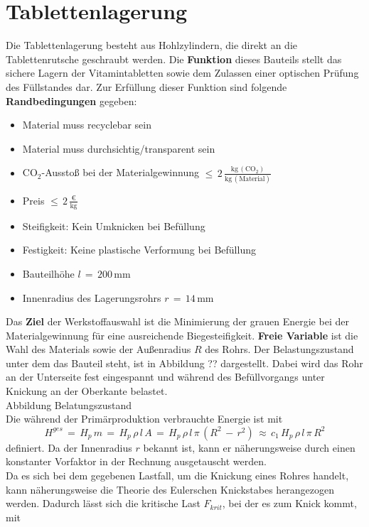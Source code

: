 \section{Tablettenlagerung}
Die Tablettenlagerung besteht aus Hohlzylindern, die direkt an die Tablettenrutsche geschraubt werden. Die \textbf{Funktion} dieses Bauteils stellt das sichere Lagern der Vitamintabletten sowie dem Zulassen einer optischen Prüfung des Füllstandes dar. Zur Erfüllung dieser Funktion sind folgende \textbf{Randbedingungen} gegeben:
\begin{itemize}
	\item Material muss recyclebar sein
	\item Material muss durchsichtig/transparent sein
	\item CO$_2$-Ausstoß bei der Materialgewinnung $\le\,2\,\frac{\text{kg}\,(\text{CO}_2)}{\text{kg}\,(\text{Material})}$
	\item Preis $\le\,2\,\frac{\text{€}}{\text{kg}}$
	\item Steifigkeit: Kein Umknicken bei Befüllung
	\item Festigkeit: Keine plastische Verformung bei Befüllung
	\item Bauteilhöhe $l\,=\,200\,$mm
	\item Innenradius des Lagerungsrohrs $r\,=\,14\,$mm
\end{itemize}
Das \textbf{Ziel} der Werkstoffauswahl ist die Minimierung der grauen Energie bei der Materialgewinnung für eine ausreichende Biegesteifigkeit. \textbf{Freie Variable} ist die Wahl des Materials sowie der Außenradius $R$ des Rohrs. Der Belastungszustand unter dem das Bauteil steht, ist in Abbildung ?? dargestellt. Dabei wird das Rohr an der Unterseite fest eingespannt und während des Befüllvorgangs unter Knickung an der Oberkante belastet.\\
Abbildung Belatungszustand\\
Die während der Primärproduktion verbrauchte Energie ist mit
\begin{equation}\label{energie33}
H^{ges}\,=\,H_p\,m\,=\,H_p\,\rho\,l\,A\,=\,H_p\,\rho\,l\,\pi\,\left(R^2\,-\,r^2\right)\,\approx\,c_1\,H_p\,\rho\,l\,\pi\,R^2
\end{equation}
definiert. Da der Innenradius $r$ bekannt ist, kann er näherungsweise durch einen konstanter Vorfaktor in der Rechnung ausgetauscht werden.\\
Da es sich bei dem gegebenen Lastfall, um die Knickung eines Rohres handelt, kann näherungsweise die Theorie des Eulerschen Knickstabes herangezogen werden. Dadurch lässt sich die kritische Last $F_{krit}$, bei der es zum Knick kommt, mit
